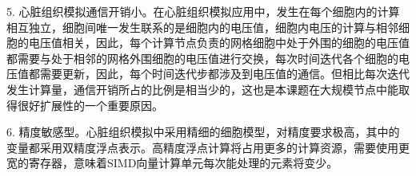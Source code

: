 \begin{compactitem}
\item[5.]
心脏组织模拟通信开销小。在心脏组织模拟应用中，发生在每个细胞内的计算相互独立，细胞间唯一发生联系的是细胞内的电压值，细胞内电压的计算与相邻细胞的电压值相关，因此，每个计算节点负责的网格细胞中处于外围的细胞的电压值都需要与处于相邻的网格外围细胞的电压值进行交换，每次时间迭代各个细胞的电压值都需要更新，因此，每个时间迭代步都涉及到电压值的通信。但相比每次迭代发生计算量，通信开销所占的比例是相当少的，这也是本课题在大规模节点中能取得很好扩展性的一个重要原因。

\item[6.]
精度敏感型。心脏组织模拟中采用精细的细胞模型，对精度要求极高，其中的变量都采用双精度浮点表示。高精度浮点计算将占用更多的计算资源，需要使用更宽的寄存器，意味着SIMD向量计算单元每次能处理的元素将变少。

\end{compactitem}

